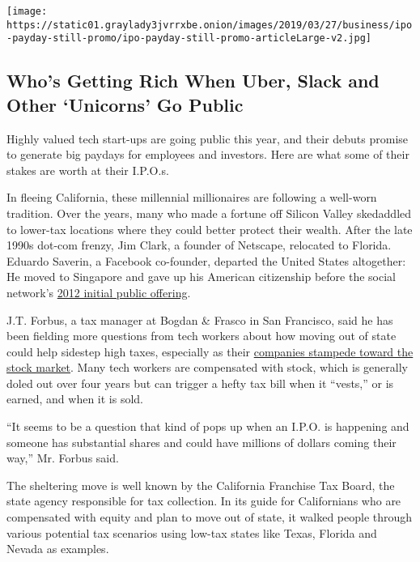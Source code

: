 \href{https://www.nytimes3xbfgragh.onion/interactive/2019/business/dealbook/ipo-investors.html}{}

\texttt{[image: https://static01.graylady3jvrrxbe.onion/images/2019/03/27/business/ipo-payday-still-promo/ipo-payday-still-promo-articleLarge-v2.jpg]}

\hypertarget{whos-getting-rich-when-uber-slack-and-other-unicorns-go-public}{%
\subsection{Who's Getting Rich When Uber, Slack and Other `Unicorns' Go
Public}\label{whos-getting-rich-when-uber-slack-and-other-unicorns-go-public}}

Highly valued tech start-ups are going public this year, and their
debuts promise to generate big paydays for employees and investors. Here
are what some of their stakes are worth at their I.P.O.s.

In fleeing California, these millennial millionaires are following a
well-worn tradition. Over the years, many who made a fortune off Silicon
Valley skedaddled to lower-tax locations where they could better protect
their wealth. After the late 1990s dot-com frenzy, Jim Clark, a founder
of Netscape, relocated to Florida. Eduardo Saverin, a Facebook
co-founder, departed the United States altogether: He moved to Singapore
and gave up his American citizenship before the social network's
\href{https://dealbook.nytimes3xbfgragh.onion/2012/05/17/facebook-raises-16-billion-in-i-p-o/}{2012
initial public offering}.

J.T. Forbus, a tax manager at Bogdan \& Frasco in San Francisco, said he
has been fielding more questions from tech workers about how moving out
of state could help sidestep high taxes, especially as their
\href{https://www.nytimes3xbfgragh.onion/2019/04/18/technology/pinterest-stock.html}{companies
stampede toward the stock market}. Many tech workers are compensated
with stock, which is generally doled out over four years but can trigger
a hefty tax bill when it ``vests,'' or is earned, and when it is sold.

``It seems to be a question that kind of pops up when an I.P.O. is
happening and someone has substantial shares and could have millions of
dollars coming their way,'' Mr. Forbus said.

The sheltering move is well known by the California Franchise Tax Board,
the state agency responsible for tax collection. In its guide for
Californians who are compensated with equity and plan to move out of
state, it walked people through various potential tax scenarios using
low-tax states like Texas, Florida and Nevada as examples.

